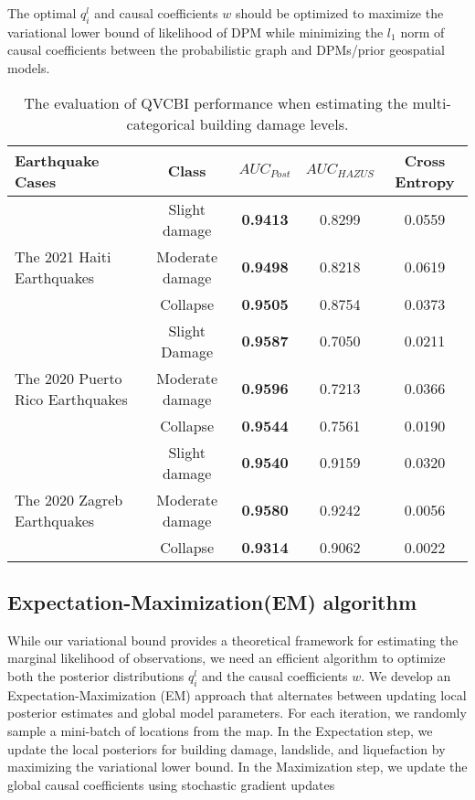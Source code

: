 \documentclass[review]{elsarticle}
\begin{document}
The optimal $q_{i}^{l}$ and causal coefficients $w$ should be optimized to maximize the variational lower bound of likelihood of DPM while minimizing the $l_{1}$ norm of causal coefficients between the probabilistic graph and DPMs/prior geospatial models. 





\begin{table*}
\caption{The evaluation of QVCBI performance when estimating the multi-categorical building damage levels.}
\centering
    \begin{tabular}{l|c|ccc}
        \toprule
         Earthquake Cases & Class & $AUC_{Post}$ & $AUC_{HAZUS}$ & Cross Entropy\\
         \midrule
        & Slight damage & \textbf{0.9413} & 0.8299 & 0.0559 \\
        The 2021 Haiti Earthquakes & Moderate damage & \textbf{0.9498}  & 0.8218  & 0.0619 \\
        & Collapse & \textbf{0.9505 }& 0.8754 & 0.0373\\
        \hline
          & Slight Damage & \textbf{0.9587} & 0.7050 & 0.0211\\
         The 2020 Puerto Rico Earthquakes & Moderate damage & \textbf{0.9596} & 0.7213 & 0.0366 \\
          & Collapse & \textbf{0.9544} & 0.7561 & 0.0190\\
         \hline
        & Slight damage & \textbf{0.9540} & 0.9159 & 0.0320 \\
        The 2020 Zagreb Earthquakes & Moderate damage & \textbf{0.9580} & 0.9242 & 0.0056 \\
        & Collapse & \textbf{0.9314} & 0.9062 & 0.0022 \\
        \bottomrule
    \end{tabular}
    \label{multi_BD}
\end{table*}



\subsection{Expectation-Maximization(EM) algorithm}
While our variational bound provides a theoretical framework for estimating the marginal likelihood of observations, we need an efficient algorithm to optimize both the posterior distributions $q_{i}^{l}$ and the causal coefficients $w$. We develop an Expectation-Maximization (EM) approach that alternates between updating local posterior estimates and global model parameters.
For each iteration, we randomly sample a mini-batch of locations from the map. In the Expectation step, we update the local posteriors for building damage, landslide, and liquefaction by maximizing the variational lower bound. In the Maximization step, we update the global causal coefficients using stochastic gradient updates
\end{document}
